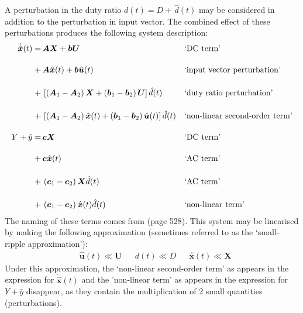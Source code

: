 \fi
A perturbation in the duty ratio $d(t) = D + \, \hat{d}(t)$ may be considered in addition to the perturbation in input vector. The combined effect of these perturbations produces the following system description:
\begingroup
\allowdisplaybreaks
\begin{align*}
\dot{\hat{\boldsymbol{x}}}(t)
= \, &\boldsymbol{A} \boldsymbol{X} + \boldsymbol{b} \boldsymbol{U}
&&\text{`DC term'}
\\[11pt]
+ \, &\boldsymbol{A} \hat{\boldsymbol{x}}(t) + \boldsymbol{b} \hat{\boldsymbol{u}}(t)
&&\text{`input vector perturbation'}
\\[11pt]
+ \, &\left[\left(\boldsymbol{A}_1 - \boldsymbol{A}_2\right)\boldsymbol{X} + \left(\boldsymbol{b}_1 - \boldsymbol{b}_2\right)\boldsymbol{U}\right] \hat{d}(t)
&&\text{`duty ratio perturbation'}
\\[11pt]
+ \, &\left[\left(\boldsymbol{A}_1 - \boldsymbol{A}_2\right)\hat{\boldsymbol{x}}(t) + \left(\boldsymbol{b}_1 - \boldsymbol{b}_2\right)\hat{\boldsymbol{u}}(t)\right] \hat{d}(t)
&&\text{`non-linear second-order term'}
\\[11pt]
Y + \hat{y} = \, &\boldsymbol{c} \boldsymbol{X}
&&\text{`DC term'}
\\[11pt]
+ \, &\boldsymbol{c} \hat{\boldsymbol{x}}(t)
&&\text{`AC term'}
\\[11pt]
+ \, &\left(\boldsymbol{c}_1 - \boldsymbol{c}_2\right) \boldsymbol{X} \hat{d}(t)
&&\text{`AC term'}
\\[11pt]
+ \, &\left(\boldsymbol{c}_1 - \boldsymbol{c}_2\right) \hat{\boldsymbol{x}}(t) \hat{d}(t)
&&\text{`non-linear term'}
\end{align*}
\endgroup
The naming of these terms comes from \cite{cuk} (page 528).
\newpar
This system may be linearised by making the following approximation (sometimes referred to as the `small-ripple approximation'):
\begin{align*}
&\hat{\boldsymbol{u}}(t) \ll \boldsymbol{U} &&d(t) \ll D &&\hat{\boldsymbol{x}}(t) \ll \boldsymbol{X}
\end{align*}
Under this approximation, the `non-linear second-order term' as appears in the expression for $\dot{\hat{\boldsymbol{x}}}(t)$ and the 'non-linear term' as appears in the expression for $Y + \hat{y}$ disappear, as they contain the multiplication of 2 small quantities (perturbations).
